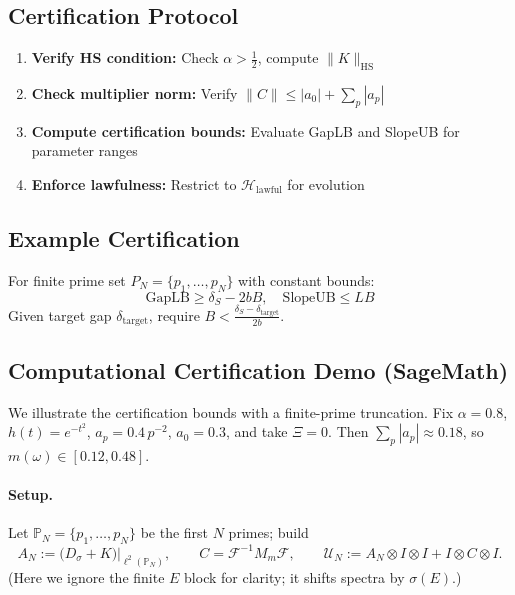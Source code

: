 \documentclass[10pt]{article}
\newcommand{\PP}{\mathbb{P}}
\newcommand{\HH}{\mathcal{H}}
\begin{document}
\subsection{Certification Protocol}

\begin{enumerate}
    \item \textbf{Verify HS condition:} Check $\alpha > \frac12$, compute $\|K\|_{\text{HS}}$
    \item \textbf{Check multiplier norm:} Verify $\|C\| \leq |a_0| + \sum_p |a_p|$  
    \item \textbf{Compute certification bounds:} Evaluate GapLB and SlopeUB for parameter ranges
    \item \textbf{Enforce lawfulness:} Restrict to $\HH_{\text{lawful}}$ for evolution
\end{enumerate}

\subsection{Example Certification}

For finite prime set $P_N = \{p_1, \dots, p_N\}$ with constant bounds:
\[
\text{GapLB} \geq \delta_S - 2bB,\quad \text{SlopeUB} \leq LB
\]
Given target gap $\delta_{\text{target}}$, require $B < \frac{\delta_S - \delta_{\text{target}}}{2b}$.
\subsection{Computational Certification Demo (SageMath)}\label{subsec:computational-demo}

We illustrate the certification bounds with a finite-prime truncation.
Fix $\alpha=0.8$, $h(t)=e^{-t^2}$, $a_p=0.4\,p^{-2}$, $a_0=0.3$, and take $\Xi=0$.
Then $\sum_p|a_p|\approx0.18$, so $m(\omega)\in[0.12,0.48]$.

\paragraph{Setup.}
Let $\PP_N=\{p_1,\dots,p_N\}$ be the first $N$ primes; build
\[
A_N:=\big(D_\sigma+K\big)\big|_{\ell^2(\PP_N)},\qquad
C=\mathcal F^{-1}M_m\mathcal F,\qquad
\mathcal U_N:=A_N\otimes I\otimes I+I\otimes C\otimes I.
\]
(Here we ignore the finite $E$ block for clarity; it shifts spectra by $\sigma(E)$.)
\end{document}
